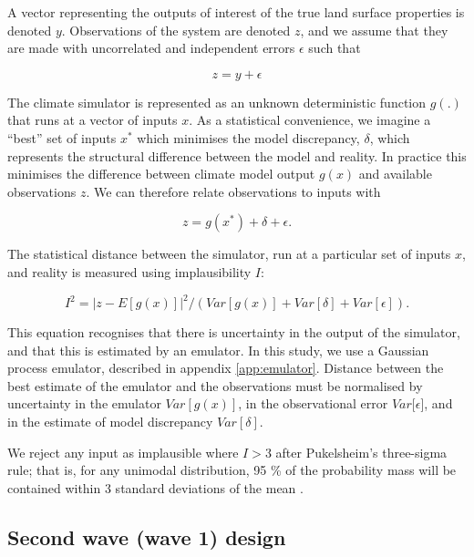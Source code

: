 \documentclass[gmd, manuscript]{copernicus}
\begin{document}
A vector representing the outputs of interest of the true land surface properties is denoted $y$. Observations of the system are denoted $z$, and we assume that they are made with uncorrelated and independent errors $\epsilon$ such that 

\begin{equation}
z = y+\epsilon
\end{equation}

The climate simulator is represented as an unknown deterministic function $g(.)$ that runs at a vector of inputs $x$. As a statistical convenience, we imagine a ``best'' set of inputs $x^*$ which minimises the model discrepancy, $\delta$, which represents the structural difference between the model and reality. In practice this minimises the difference between climate model output $g(x)$ and available observations $z$. We can therefore relate observations to inputs with 

\begin{equation}
z = g(x^*) + \delta + \epsilon. 
\end{equation}

The statistical distance between the simulator, run at a particular set of inputs $x$, and reality is measured using implausibility $I$:

\begin{equation}\label{eq:implausibility}
I^{2} = {\lvert  z - E[g(x)]\rvert}^{2} /  (Var[g(x)] + Var[\delta] +  Var[\epsilon]).
\end{equation}

This equation recognises that there is uncertainty in the output of the simulator, and that this is estimated by an emulator. In this study, we use a Gaussian process emulator, described in appendix \ref{app:emulator}. Distance between the best estimate of the emulator and the observations must be normalised by uncertainty in the emulator $Var[g(x)]$, in the observational error $Var[\epsilon$], and in the estimate of model discrepancy $Var[\delta]$. 

We reject any input as implausible where $I >3$ after Pukelsheim's three-sigma rule; that is, for any unimodal distribution, 95 \% of the probability mass will be contained within 3 standard deviations of the mean \citep{pukelsheim1994three}.

\subsection{Second wave (wave 1) design}\label{ssec:second_wave_design}
\end{document}
